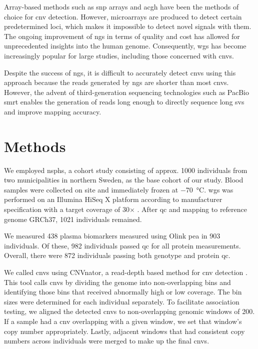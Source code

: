 \documentclass[draft]{scrbook}
\begin{document}
Array-based methods such as \gls{snp} arrays and \gls{acgh} have been the methods of choice for \gls{cnv} detection.
However, microarrays are produced to detect certain predetermined loci, which makes it impossible to detect novel signals with them.
The ongoing improvement of \gls{ngs} in terms of quality and cost has allowed for unprecedented insights into the human genome.
Consequently, \gls{wgs} has become increasingly popular for large studies, including those concerned with \glspl{cnv}.

Despite the success of \gls{ngs}, it is difficult to accurately detect \glspl{cnv} using this approach because the reads generated by \gls{ngs} are shorter than most \glspl{cnv}.
However, the advent of third-generation sequencing technologies such as PacBio \gls{smrt} enables the generation of reads long enough to directly sequence long \glspl{sv} and improve mapping accuracy.

\section{Methods}
We employed \gls{nsphs}, a cohort study consisting of approx. 1000 individuals from two municipalities in northern Sweden, as the base cohort of our study.
Blood samples were collected on site and immediately frozen at \qty{-70}{\celsius}.
\Gls{wgs} was performed on an Illumina HiSeq X platform according to manufacturer specification with a target coverage of 30$\times$ \cite{Ameur2017}.
After \gls{qc} and mapping to reference genome GRCh37, 1021 individuals remained.

We measured 438 plasma biomarkers measured using Olink \gls{pea} in 903 individuals.
Of these, 982 individuals passed \gls{qc} for all protein measurements.
Overall, there were 872 individuals passing both genotype and protein \gls{qc}.

We called \glspl{cnv} using \textsf{CNVnator}, a read-depth based method for \gls{cnv} detection \cite{Abyzov2011b}.
This tool calls \glspl{cnv} by dividing the genome into non-overlapping bins and identifying those bins that received abnormally high or low coverage.
The bin sizes were determined for each individual separately.
To facilitate association testing, we aligned the detected \glspl{cnv} to non-overlapping genomic windows of \qty{200}{\base}.
If a sample had a \gls{cnv} overlapping with a given window, we set that window's copy number appropriately.
Lastly, adjacent windows that had consistent copy numbers across individuals were merged to make up the final \glspl{cnv}.
\end{document}
